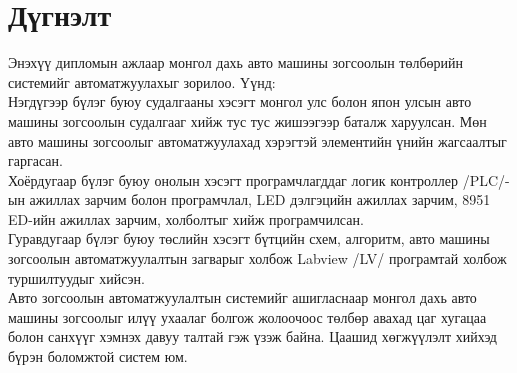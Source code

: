 
\section*{\centering Дүгнэлт }
Энэхүү дипломын ажлаар монгол дахь авто машины зогсоолын төлбөрийн системийг автоматжуулахыг зорилоо. Үүнд: \\

Нэгдүгээр бүлэг буюу судалгааны хэсэгт монгол улс болон япон улсын авто машины зогсоолын судалгааг хийж тус тус жишээгээр баталж харуулсан. Мөн авто машины зогсоолыг автоматжуулахад хэрэгтэй элементийн үнийн жагсаалтыг гаргасан. \\

Хоёрдугаар бүлэг буюу онолын хэсэгт програмчлагддаг логик контроллер /PLC/-ын ажиллах зарчим болон програмчлал, LED дэлгэцийн ажиллах зарчим, 8951 ED-ийн ажиллах зарчим, холболтыг хийж програмчилсан. \\

Гуравдугаар бүлэг буюу төслийн хэсэгт бүтцийн схем, алгоритм, авто машины зогсоолын автоматжуулалтын загварыг холбож Labview /LV/ програмтай холбож туршилтуудыг хийсэн. \\

Авто зогсоолын автоматжуулалтын системийг ашигласнаар монгол дахь авто машины зогсоолыг илүү ухаалаг болгож жолоочоос төлбөр авахад цаг хугацаа болон санхүүг хэмнэх давуу талтай гэж үзэж байна. Цаашид хөгжүүлэлт хийхэд бүрэн боломжтой систем юм. 
